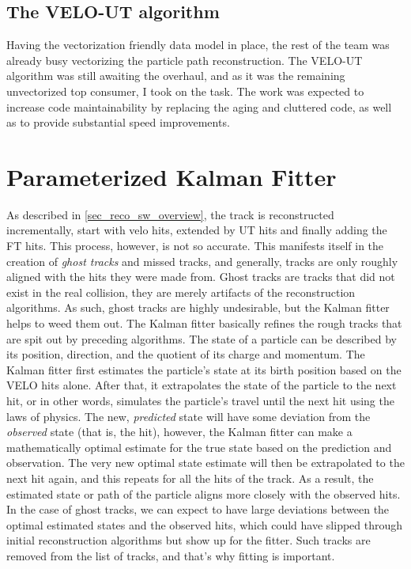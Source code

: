 \documentclass[12pt]{article}
\begin{document}
\subsection{The VELO-UT algorithm}

Having the vectorization friendly data model in place, the rest of the team was already busy vectorizing the particle path reconstruction. The VELO-UT algorithm was still awaiting the overhaul, and as it was the remaining unvectorized top consumer, I took on the task. The work was expected to increase code maintainability by replacing the aging and cluttered code, as well as to provide substantial speed improvements.


\newpage
\section{Parameterized Kalman Fitter}\label{sec_kalman_main}

As described in \ref{sec_reco_sw_overview}, the track is reconstructed incrementally, start with velo hits, extended by UT hits and finally adding the FT hits. This process, however, is not so accurate. This manifests itself in the creation of \textit{ghost tracks} and missed tracks, and generally, tracks are only roughly aligned with the hits they were made from. Ghost tracks are tracks that did not exist in the real collision, they are merely artifacts of the reconstruction algorithms. As such, ghost tracks are highly undesirable, but the Kalman fitter helps to weed them out. 
The Kalman fitter basically refines the rough tracks that are spit out by preceding algorithms. The state of a particle can be described by its position, direction, and the quotient of its charge and momentum. The Kalman fitter first estimates the particle's state at its birth position based on the VELO hits alone. After that, it extrapolates the state of the particle to the next hit, or in other words, simulates the particle's travel until the next hit using the laws of physics. The new, \textit{predicted} state will have some deviation from the \textit{observed} state (that is, the hit), however, the Kalman fitter can make a mathematically optimal estimate for the true state based on the prediction and observation. The very new optimal state estimate will then be extrapolated to the next hit again, and this repeats for all the hits of the track.
As a result, the estimated state or path of the particle aligns more closely with the observed hits. In the case of ghost tracks, we can expect to have large deviations between the optimal estimated states and the observed hits, which could have slipped through initial reconstruction algorithms but show up for the fitter. Such tracks are removed from the list of tracks, and that's why fitting is important.
\end{document}
